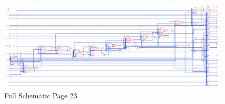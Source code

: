 \documentclass[11pt]{article}
\begin{document}
		
		\begin{figure}[H] 
			\centering 
			\includegraphics[width=\textwidth,height=\dimexpr\textheight-4\baselineskip-\abovecaptionskip-\belowcaptionskip\relax,keepaspectratio]{"Pictures/Full Schematic Page 23"}
			\caption{Full Schematic Page 23} 
			\label{fig:Full-Schematic-Page-23} 
		\end{figure}
		
\end{document}
